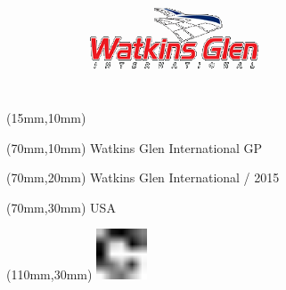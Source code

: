 \null\newpage
\begin{textblock*}{50mm}(15mm,10mm)%
\includegraphics[width=50mm]{LG/WAT.png}
\end{textblock*}
\begin{textblock*}{130mm}(70mm,10mm)%
{\fontsize{20}{20}\selectfont Watkins Glen International GP}\\
\end{textblock*}
\begin{textblock*}{120mm}(70mm,20mm)%
{\fontsize{16}{16}\selectfont Watkins Glen International / 2015}\\
\end{textblock*}
\begin{textblock*}{120mm}(70mm,30mm)%
{\fontsize{12}{12}\selectfont USA}
\end{textblock*}
\begin{textblock*}{30mm}(110mm,30mm)%
\centering
\includegraphics[height=15mm]{icons/fa-rotate-right.pdf}
\end{textblock*}
